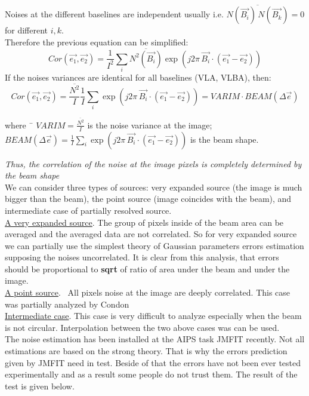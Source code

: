 Noises at the different baselines are independent usually i.e.
$\overline{N(\vec{B_i}) \, N(\vec{B_k})} = 0 $ for different $i,k$.\\
Therefore the previous equation can be simplified:
\begin{equation}
Cor(\vec{e_1}, \vec{e_2})
= \frac{1}{I^2} \sum_i \overline{ N^2(\vec{B_i})}
\exp(j 2 \pi \, \vec{B_i}\cdot (\vec{e_1} - \vec{e_2} ))
\label{eq:cor2}
\end{equation}
If the noises variances are identical for all baselines (VLA, VLBA),
then:
\begin{equation}
Cor(\vec{e_1}, \vec{e_2})
= \frac{\overline{N^2}}{I} \frac {1}{I} \sum_i
\exp(j 2 \pi \, \vec{B_i}\cdot (\vec{e_1} - \vec{e_2} )) =
VARIM \cdot BEAM(\Delta \vec{e})
\label{eq:cor3}
\end{equation}
\begin{tabbing}
where~
\= $VARIM = \frac{\overline{N^2}}{I}$ is the noise variance at the image; \\
\> $BEAM(\Delta \vec{e}) = \frac {1}{I} \sum_i
\exp(j 2 \pi \, \vec{B_i}\cdot (\vec{e_1} - \vec{e_2} ))$ is the beam shape.\\
\end{tabbing}
{\em Thus, the correlation of the noise at the image pixels is completely determined by the beam shape }\\

We can  consider three types of sources:  very expanded source (the image is much bigger than the beam), the point source (image coincides with the beam), and intermediate case of partially resolved source.\\
\underline {A very expanded source}. The group of pixels inside of the beam area can be averaged and the averaged data are not correlated. So for very expanded source we can partially use the simplest theory of Gaussian parameters errors estimation supposing the noises uncorrelated. It is clear from this analysis, that errors should be proportional to {\bf sqrt} of ratio of area under the beam and under the image. \\
\underline {A point source}.~ All pixels noise at the image are deeply
correlated. This case was partially analyzed by Condon \cite{con}\\
\underline {Intermediate case}. This case is very difficult to analyze  especially when the beam is not circular. Interpolation between the two above cases was can be used.\\
The noise estimation has been installed at the AIPS task JMFIT recently.
Not all estimations are based on the strong theory. That is why the errors prediction given by JMFIT need in test. Beside of that the errors have not been ever tested experimentally and as a result some people do not trust them. The result of the test is given below.
